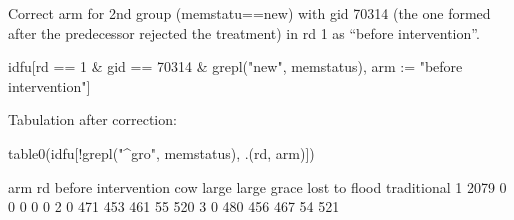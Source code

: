 Correct \textsf{arm} for 2nd group (\textsf{memstatu}==new) with \textsf{gid} 70314 (the one formed after the predecessor rejected the treatment) in rd 1 as ``before intervention''. 
\begin{Schunk}
\begin{Sinput}
idfu[rd == 1 & gid == 70314 & grepl("new", memstatus), arm := "before intervention"]
\end{Sinput}
\end{Schunk}
Tabulation after correction: \label{crosstab.rd.arm.wo.group.rejecters}
\begin{Schunk}
\begin{Sinput}
table0(idfu[!grepl("^gro", memstatus), .(rd, arm)])
\end{Sinput}
\begin{Soutput}
   arm
rd  before intervention  cow large large grace lost to flood traditional
  1                2079    0     0           0             0           0
  2                   0  471   453         461            55         520
  3                   0  480   456         467            54         521
\end{Soutput}
\end{Schunk}


